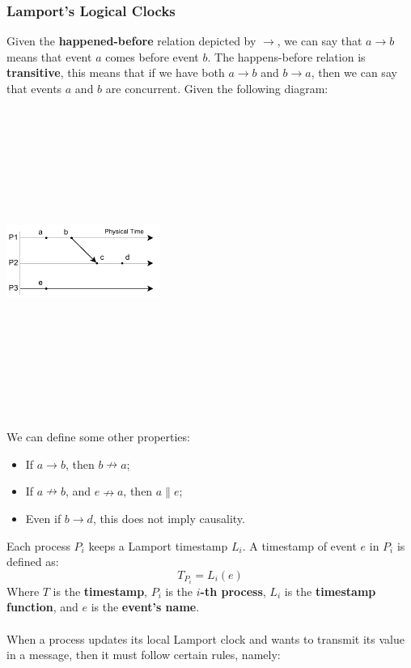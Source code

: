 \documentclass{article}
\begin{document}
\subsubsection{Lamport's Logical Clocks}
Given the \textbf{happened-before} relation depicted by $\rightarrow$, we can say that $a \rightarrow b$ means that event $a$ comes before event $b$. The happens-before relation is \textbf{transitive}, this means that if we have both $a \rightarrow b$ and $b \rightarrow a$, then we can say that events $a$ and $b$ are concurrent. Given the following diagram:
\begin{center}
	\includegraphics[width=5cm, height=10cm, keepaspectratio]{assets/lamport.pdf}
\end{center}
We can define some other properties:
\begin{itemize}
	\item If $a \rightarrow b$, then $b \nrightarrow a$;
	\item If $a \nrightarrow b$, and $e \nrightarrow a$, then $a \parallel e$;
	\item Even if $b \rightarrow d$, this does not imply causality.
\end{itemize}
Each process $P_i$ keeps a Lamport timestamp $L_i$. A timestamp of event $e$ in $P_i$ is defined as:
\[ T_{P_i} = L_i(e) \]
Where $T$ is the \textbf{timestamp}, $P_i$ is the \textbf{$i$-th process}, $L_i$ is the \textbf{timestamp function}, and $e$ is the \textbf{event's name}.\\ \\
When a process updates its local Lamport clock and wants to transmit its value in a message, then it must follow certain rules, namely:
\end{document}
